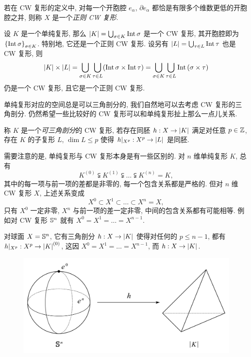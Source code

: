 \begin{Definition}[正则 CW 复形]
	若在 CW 复形的定义中, 对每一个开胞腔 $ e_\alpha $, $ \partial e_\alpha $ 都恰是有限多个维数更低的开胞腔之并, 则称 $ X $ 是一个\emph{正则 CW 复形}.
\end{Definition}

\begin{Example}
	设 $ K $ 是一个单纯复形, 那么 $ \abs{K}=\bigcup_{\sigma\in K}\mathrm{Int}\,\sigma $ 是一个 CW 复形, 其开胞腔即为 $ \set{\mathrm{Int}\,\sigma}_{\sigma\in K} $. 特别地, 它还是一个正则 CW 复形. 设另有 $ \abs{L}=\bigcup_{\tau\in L}\mathrm{Int}\,\tau $ 也是 CW 复形, 则
	\[
		\abs{K}\times\abs{L}=\bigcup_{\sigma\in K}\bigcup_{\tau\in L}(\mathrm{Int}\,\sigma\times\mathrm{Int}\,\tau)=\bigcup_{\sigma\in K}\bigcup_{\tau\in L}\mathrm{Int}\,(\sigma\times\tau)
	\]
	仍是一个 CW 复形, 且它是一个正则 CW 复形.
\end{Example}

单纯复形对应的空间总是可以三角剖分的, 我们自然地可以去考虑 CW 复形的三角剖分. 仍然希望一些比较好的 CW 复形可以和单纯复形扯上那么一点儿关系.

\begin{Definition}[三角剖分]
	称 $ K $ 是一个\emph{可三角剖分}的 CW 复形, 若存在同胚 $ h : X\to\abs{K} $ 满足对任意 $ p\in\Z $, 存在 $ K $ 的子复形 $ L $, $ \dim L\leqslant p $ 使得 $ h|_{X^p} : X^p\to \abs{L} $ 是同胚.
\end{Definition}

需要注意的是, 单纯复形与 CW 复形本身是有一些区别的. 对 $ n $ 维单纯复形 $ K $, 总有
\[
	K^{(0)}\subsetneqq K^{(1)}\subsetneqq\dots\subsetneqq K^{(n)}=K,
\]
其中的每一项与前一项的差都是非零的, 每一个包含关系都是严格的. 但对 $ n $ 维 CW 复形 $ X $, 上述关系变成
\[
	X^0\subset X^1\subset\dots\subset X^n=X,
\]
只有 $ X^0 $ 一定非零, $ X^n $ 与前一项的差一定非零, 中间的包含关系都有可能相等. 例如对 CW 复形 $ \S^n $ 就有 $ X^0=X^1=\dots=X^{n-1} $.

\begin{Example}
	对球面 $ X=\S^n $, 它有三角剖分 $ h : X\to\abs{K} $ 使得对任何的 $ p\leqslant n-1 $, 都有 $ h|_{X^{p}} : X^p\to\abs{K}^{(0)} $, 这因 $ X^0=X^1=\dots=X^{n-1} $, 而 $ h : X\to\abs{K} $.
	\begin{figure}[htbp]
		\centering
		\includegraphics[width=0.55\linewidth]{figures/Sec12-2.png}
	\end{figure}
\end{Example}

